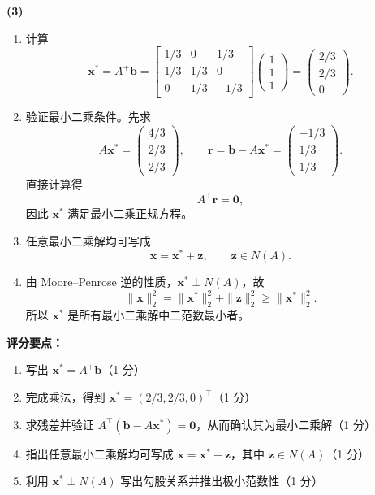 \documentclass[10pt,a4paper]{exam-zh}
\newcommand{\bvec}[1]{\boldsymbol{#1}}
\newenvironment{grading}
  {\par\smallskip\Needspace{5\baselineskip}\small
   \noindent\textcolor{gradingred}{\textbf{评分要点：}}
   \begin{enumerate}[label=\textcolor{gradingred}{\arabic*.},
     leftmargin=2.4em,itemsep=0pt,topsep=2pt,parsep=0pt]}
  {\end{enumerate}\smallskip}
\newcommand{\gradeitem}[2]{\item #1（\textcolor{gradingred}{#2 分}）}
\newenvironment{answersteps}
  {\begin{enumerate}[label=\textbf{步骤 \arabic*.},
    leftmargin=4.8em,labelsep=0.6em,itemsep=2pt,topsep=3pt,parsep=0pt]}
  {\end{enumerate}}
\newcommand{\subanswer}[1]{%
  \par\medskip\Needspace{6\baselineskip}\noindent\textbf{#1}\par}
\begin{document}
\begin{solution}
\subanswer{(3)}
\begin{answersteps}
  \item 计算
  \[
  \bvec x^*=A^+\bvec b
  =
  \begin{bmatrix}
  1/3&0&1/3\\
  1/3&1/3&0\\
  0&1/3&-1/3
  \end{bmatrix}
  \begin{pmatrix}1\\1\\1\end{pmatrix}
  =
  \boxed{\begin{pmatrix}2/3\\2/3\\0\end{pmatrix}}.
  \]
  \item 验证最小二乘条件。先求
  \[
  A\bvec x^*=
  \begin{pmatrix}4/3\\2/3\\2/3\end{pmatrix},
  \qquad
  \bvec r=\bvec b-A\bvec x^*
  =
  \begin{pmatrix}-1/3\\1/3\\1/3\end{pmatrix}.
  \]
  直接计算得
  \[
  A^\top\bvec r=\bvec0,
  \]
  因此 $\bvec x^*$ 满足最小二乘正规方程。
  \item 任意最小二乘解均可写成
  \[
  \bvec x=\bvec x^*+\bvec z,
  \qquad
  \bvec z\in N(A).
  \]
  \item 由 Moore--Penrose 逆的性质，$\bvec x^*\perp N(A)$，故
  \[
  \|\bvec x\|_2^2
  =\|\bvec x^*\|_2^2+\|\bvec z\|_2^2
  \ge \|\bvec x^*\|_2^2.
  \]
  所以 $\bvec x^*$ 是所有最小二乘解中二范数最小者。
\end{answersteps}
\begin{grading}
  \gradeitem{写出 $\bvec x^*=A^+\bvec b$}{1}
  \gradeitem{完成乘法，得到 $\bvec x^*=(2/3,2/3,0)^\top$}{1}
  \gradeitem{求残差并验证 $A^\top(\bvec b-A\bvec x^*)=\bvec0$，从而确认其为最小二乘解}{1}
  \gradeitem{指出任意最小二乘解均可写成
  $\bvec x=\bvec x^*+\bvec z$，其中 $\bvec z\in N(A)$}{1}
  \gradeitem{利用 $\bvec x^*\perp N(A)$ 写出勾股关系并推出极小范数性}{1}
\end{grading}
\end{solution}
\end{document}
